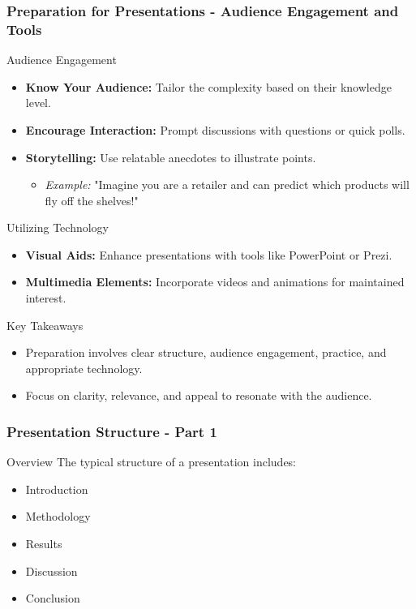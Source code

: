 \documentclass[aspectratio=169]{beamer}
\begin{document}
\begin{frame}[fragile]
    \frametitle{Preparation for Presentations - Audience Engagement and Tools}
    \begin{block}{Audience Engagement}
        \begin{itemize}
            \item \textbf{Know Your Audience:} Tailor the complexity based on their knowledge level.
            \item \textbf{Encourage Interaction:} Prompt discussions with questions or quick polls.
            \item \textbf{Storytelling:} Use relatable anecdotes to illustrate points.
                \begin{itemize}
                    \item \textit{Example:} "Imagine you are a retailer and can predict which products will fly off the shelves!"
                \end{itemize}
        \end{itemize}
    \end{block}
    
    \begin{block}{Utilizing Technology}
        \begin{itemize}
            \item \textbf{Visual Aids:} Enhance presentations with tools like PowerPoint or Prezi.
            \item \textbf{Multimedia Elements:} Incorporate videos and animations for maintained interest.
        \end{itemize}
    \end{block}
    
    \begin{block}{Key Takeaways}
        \begin{itemize}
            \item Preparation involves clear structure, audience engagement, practice, and appropriate technology.
            \item Focus on clarity, relevance, and appeal to resonate with the audience.
        \end{itemize}
    \end{block}
\end{frame}

\begin{frame}[fragile]
    \frametitle{Presentation Structure - Part 1}
    \begin{block}{Overview}
        The typical structure of a presentation includes:
        \begin{itemize}
            \item Introduction
            \item Methodology
            \item Results
            \item Discussion
            \item Conclusion
        \end{itemize}
    \end{block}
\end{frame}
\end{document}
